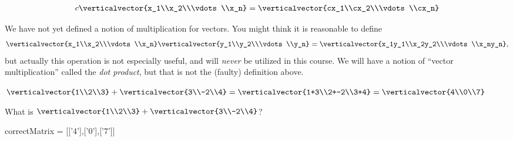 \documentclass{ximera}
\begin{document}
\[ c\verticalvector{x_1\\x_2\\\vdots\\x_n} = \verticalvector{cx_1\\cx_2\\\vdots\\cx_n} \]
 	 
\begin{warning}
  We have not yet defined a notion of multiplication for vectors.  You might think it is reasonable to define 
\[
\verticalvector{x_1\\x_2\\\vdots\\x_n} \verticalvector{y_1\\y_2\\\vdots\\y_n}=\verticalvector{x_1y_1\\x_2y_2\\\vdots\\x_ny_n},
\] but 
actually this operation is not especially useful, and will
\textit{never} be utilized in this course.  We will have a notion of
``vector multiplication'' called the \textit{dot product}, but that is
not the (faulty) definition above.
\end{warning}

\begin{question}
  \begin{solution}
    \begin{hint}
      $\verticalvector{1\\2\\3}+\verticalvector{3\\-2\\4} = \verticalvector{1+3\\2+-2\\3+4} = \verticalvector{4\\0\\7}$
    \end{hint}
    What is $\verticalvector{1\\2\\3}+\verticalvector{3\\-2\\4}$?
    
    \begin{matrix-answer}[name=v]
      correctMatrix = [['4'],['0'],['7']]
    \end{matrix-answer}
  \end{solution}
\end{question}
 	
\end{document}
